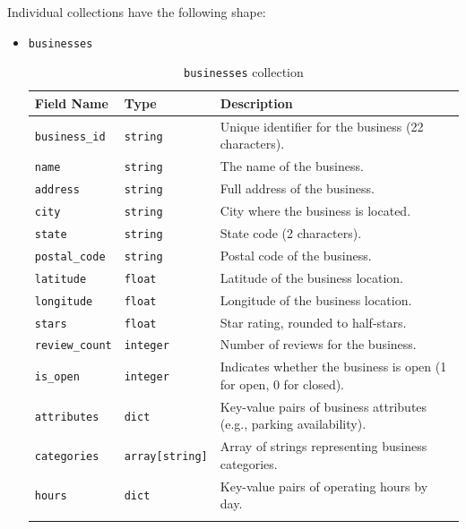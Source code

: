 \documentclass{Configuration_Files/PoliMi3i_thesis}
\begin{document}
Individual collections have the following shape:
\begin{itemize}

\item{\texttt{businesses}}
\begin{longtable}{|p{3cm}|p{3cm}|p{10cm}|}
\hline
\textbf{Field Name} & \textbf{Type} & \textbf{Description} \\ \hline
\texttt{business\_id} & \texttt{string} & Unique identifier for the business (22 characters). \\ \hline
\texttt{name} & \texttt{string} & The name of the business. \\ \hline
\texttt{address} & \texttt{string} & Full address of the business. \\ \hline
\texttt{city} & \texttt{string} & City where the business is located. \\ \hline
\texttt{state} & \texttt{string} & State code (2 characters). \\ \hline
\texttt{postal\_code} & \texttt{string} & Postal code of the business. \\ \hline
\texttt{latitude} & \texttt{float} & Latitude of the business location. \\ \hline
\texttt{longitude} & \texttt{float} & Longitude of the business location. \\ \hline
\texttt{stars} & \texttt{float} & Star rating, rounded to half-stars. \\ \hline
\texttt{review\_count} & \texttt{integer} & Number of reviews for the business. \\ \hline
\texttt{is\_open} & \texttt{integer} & Indicates whether the business is open (1 for open, 0 for closed). \\ \hline
\texttt{attributes} & \texttt{dict} & Key-value pairs of business attributes (e.g., parking availability). \\ \hline
\texttt{categories} & \texttt{array[string]} & Array of strings representing business categories. \\ \hline
\texttt{hours} & \texttt{dict} & Key-value pairs of operating hours by day. \\ \hline
\caption{\texttt{businesses} collection}
\end{longtable}


\end{itemize}
\end{document}
